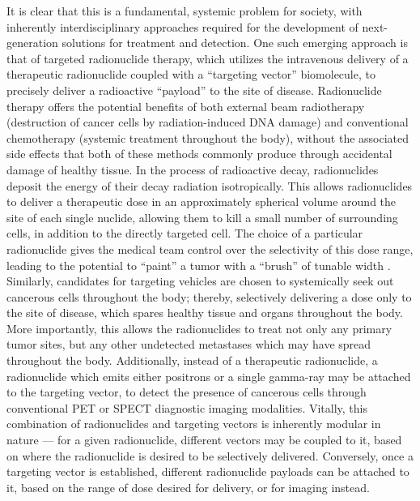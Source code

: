It is clear that this is a fundamental, systemic problem for society, with inherently interdisciplinary approaches required for the development of next-generation solutions for treatment and detection.  
One such emerging approach is that of targeted radionuclide therapy, which utilizes the intravenous delivery of a therapeutic radionuclide coupled with a \enquote{targeting vector} biomolecule, to precisely deliver a radioactive \enquote{payload} to the site of disease. 
Radionuclide therapy offers the potential benefits of both external beam radiotherapy (destruction of cancer cells by radiation-induced DNA damage) and conventional chemotherapy (systemic treatment throughout the body), without the associated side effects that both of these methods commonly produce through accidental damage of healthy tissue.  
In the process of radioactive decay, radionuclides deposit the energy of their decay radiation isotropically. 
This allows radionuclides to deliver a therapeutic dose in an approximately spherical volume around the site of each single nuclide, allowing them to kill a small number of surrounding cells, in addition to the directly targeted cell. 
The choice of a particular radionuclide gives the medical team control over the selectivity of this dose range, leading to the potential to \enquote{paint} a tumor with a \enquote{brush} of tunable width \cite{M.2017}. 
Similarly, candidates for targeting vehicles are chosen to systemically seek out cancerous cells throughout the body; thereby, selectively delivering a dose only to the site of disease, which spares healthy tissue and organs throughout the body. 
More importantly, this allows the radionuclides to treat not only any primary tumor sites, but any other undetected metastases which may have spread throughout the body. 
Additionally, instead of a therapeutic radionuclide, a radionuclide which emits either positrons or a single gamma-ray may be attached to the targeting vector, to detect the presence of cancerous cells through conventional PET or SPECT diagnostic imaging modalities. 
Vitally, this combination of radionuclides and targeting vectors is inherently modular in nature --- for a given radionuclide, different vectors may be coupled to it, based on where the radionuclide is desired to be selectively delivered. 
Conversely, once a targeting vector is established, different radionuclide payloads can be attached to it, based on the range of dose desired for delivery, or for imaging instead.

